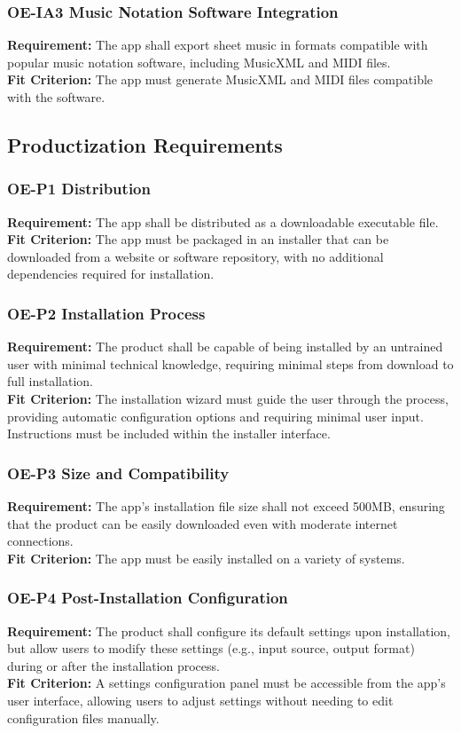 \documentclass[12pt]{article}
\begin{document}
\subsubsection*{OE-IA3 Music Notation Software Integration}
\textbf{Requirement:} The app shall export sheet music in formats compatible with popular music notation software, including MusicXML and MIDI files.\\
\textbf{Fit Criterion:} The app must generate MusicXML and MIDI files compatible with the software.\\

\subsection{Productization Requirements}
\subsubsection*{OE-P1 Distribution}
\textbf{Requirement:} The app shall be distributed as a downloadable executable file.\\
\textbf{Fit Criterion:} The app must be packaged in an installer that can be downloaded from a website or software repository, with no additional dependencies required for installation.
\subsubsection*{OE-P2 Installation Process}
\textbf{Requirement:} The product shall be capable of being installed by an untrained user with minimal technical knowledge, requiring minimal steps from download to full installation.\\
\textbf{Fit Criterion:} The installation wizard must guide the user through the process, providing automatic configuration options and requiring minimal user input. Instructions must be included within the installer interface.
\subsubsection*{OE-P3 Size and Compatibility}
\textbf{Requirement:} The app’s installation file size shall not exceed 500MB, ensuring that the product can be easily downloaded even with moderate internet connections.\\
\textbf{Fit Criterion:} The app must be easily installed on a variety of systems.
\subsubsection*{OE-P4 Post-Installation Configuration}
\textbf{Requirement:} The product shall configure its default settings upon installation, but allow users to modify these settings (e.g., input source, output format) during or after the installation process.\\
\textbf{Fit Criterion:} A settings configuration panel must be accessible from the app's user interface, allowing users to adjust settings without needing to edit configuration files manually.
\end{document}
